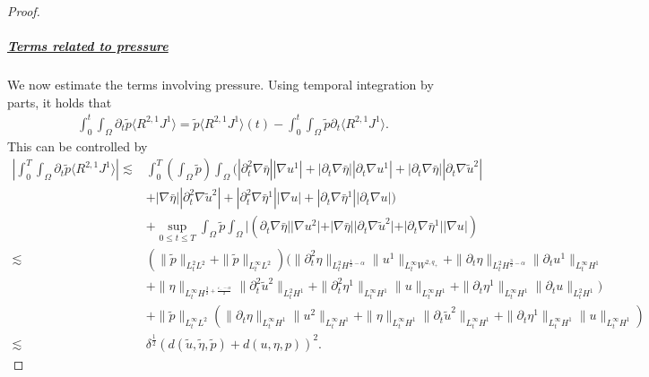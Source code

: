 \documentclass[letterpaper,reqno,10pt,twoside]{amsart}
\theoremstyle{definition}
\theoremstyle{remark}
\def\p{\partial}
\begin{document}
\begin{proof}
			\subparagraph{\underline{Terms related to pressure}}
			We now estimate the terms involving pressure. Using temporal integration by parts, it holds that
			\[
			\begin{aligned}
				\int_{0}^{t}\int_{\Omega}\p_{t}\tilde{p}\langle R^{2,1}J^{1}\rangle=\tilde{p}\langle R^{2,1}J^{1}\rangle(t)-\int_{0}^{t}\int_{\Omega}\tilde{p}\p_{t}\langle R^{2,1}J^{1}\rangle.
			\end{aligned}
			\]
			\noindent This can be controlled by
			\[
			\begin{aligned}
				|\int_{0}^{T}\int_{\Omega}\p_{t}\tilde{p}\langle R^{2,1}J^{1}\rangle|\lesssim& \int_{0}^{T}(\int_{\Omega}\tilde{p})\int_{\Omega} (|\p_{t}^{2}\nabla\bar{\eta}||\nabla u^{1}|+|\p_{t}\nabla \bar{\eta}||\p_{t}\nabla u^{1}|+|\p_{t}\nabla \bar{\eta}||\p_{t}\nabla\tilde{u}^{2}|\\
				&+|\nabla\bar{\eta}||\p_{t}^{2}\nabla\tilde{u}^{2}|+|\p_{t}^{2}\nabla \bar{\eta}^{1}||\nabla u|+|\p_{t}\nabla \bar{\eta}^{1}||\p_{t}\nabla u|)\\
				&+\sup_{0\leq t\leq T}\int_{\Omega}\tilde{p}\int_{\Omega}|(\p_{t}\nabla \bar{\eta}||\nabla u^{2}|+|\nabla \bar{\eta}||\p_{t}\nabla\tilde{u}^{2}|+|\p_{t}\nabla\bar{\eta}^{1}||\nabla u|)\\
				\lesssim& (\|\tilde{p}\|_{L_{t}^{2}L^{2}}+\|\tilde{p}\|_{L_{t}^{\infty}L^{2}})\bigg( \|\p_{t}^{2}\eta\|_{L_{t}^{2}H^{\frac{1}{2}-\alpha}}\|u^{1}\|_{L_{t}^{\infty}W^{2,q_{+}}}+\|\p_{t}\eta\|_{L_{t}^{2}H^{\frac{3}{2}-\alpha}}\|\p_{t}u^{1}\|_{L_{t}^{\infty}H^{1}}\\
				&+\|\eta\|_{L_{t}^{\infty}H^{\frac{3}{2}+\frac{\varepsilon_{-}-\alpha}{2}}}\|\p_{t}^{2}\tilde{u}^{2}\|_{L_{t}^{2}H^{1}}+\|\p_{t}^{2}\eta^{1}\|_{L_{t}^{\infty}H^{1}}\|u\|_{L_{t}^{\infty}H^{1}}+\|\p_{t}\eta^{1}\|_{L_{t}^{\infty}H^{1}}\|\p_{t}u\|_{L_{t}^{2}H^{1}}\bigg)\\
				&+\|\tilde{p}\|_{L_{t}^{\infty}L^{2}}(\|\p_{t}\eta\|_{L_{t}^{\infty}H^{1}}\|u^{2}\|_{L_{t}^{\infty}H^{1}}+\|\eta\|_{L_{t}^{\infty}H^{1}}\|\p_{t}\tilde{u}^{2}\|_{L_{t}^{\infty}H^{1}}+\|\p_{t}\eta^{1}\|_{L_{t}^{\infty}H^{1}}\|u\|_{L_{t}^{\infty}H^{1}})\\
				\lesssim& \delta^{\frac{1}{2}}(d(\tilde{u},\tilde{\eta},\tilde{p})+d({u},{\eta},{p}))^{2}.
			\end{aligned}
			\]
			

\end{proof}
\end{document}

